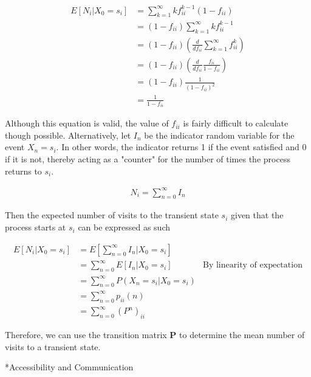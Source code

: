 \documentclass[a4paper, 12pt]{article}
\begin{document}
	\begin{equation*}
		\begin{aligned}
			E[N_i|X_0 = s_i] &= \sum_{k=1}^\infty kf_{ii}^{k-1}(1-f_{ii}) \\
							&= (1-f_{ii})\sum_{k=1}^\infty kf_{ii}^{k-1} \\
							&= (1-f_{ii}) (\frac{d}{df_{ii}} \sum_{k=1}^\infty f_{ii}^{k}) \\
							&= (1-f_{ii}) (\frac{d}{df_{ii}} \frac{f_{ii}}{1-f_{ii}}) \\
							&= (1-f_{ii}) \frac{1}{(1-f_{ii})^2} \\
							&= \frac{1}{1-f_{ii}}\
		\end{aligned}
	\end{equation*}	
	
	Although this equation is valid, the value of $f_{ii}$ is fairly difficult to calculate though possible. Alternatively, let $I_n$ be the indicator random variable for the event $X_n=s_i$. In other words, the indicator returns 1 if the event satisfied and 0 if it is not, thereby acting as a "counter" for the number of times the process returns to $s_i$.
	
	\begin{equation*}
	\begin{aligned}
		 N_i = \sum_{n=0}^\infty I_n
	\end{aligned}
	\end{equation*}	
	
	 Then the expected number of visits to the transient state $s_i$ given that the process starts at $s_i$ can be expressed as such
	
	
	\begin{equation*}
	\begin{aligned}
		 E[N_i|X_0 = s_i] &= E\left[\sum_{n=0}^\infty I_n | X_0 = s_i\right] \\
		 				  &= \sum_{n=0}^\infty E\left[I_n | X_0 = s_i\right] &\text{By linearity of expectation}\\
		 				  &= \sum_{n=0}^\infty P(X_n = s_i | X_0 = s_i) \\
		 				  &= \sum_{n=0}^\infty p_{ii}(n) \\
		 				  &= \sum_{n=0}^\infty (P^n)_{ii}
	\end{aligned}
	\end{equation*}	
	
Therefore, we can use the transition matrix \textbf{P} to determine the mean number of visits to a transient state.

*{Accessibility and Communication}
\end{document}
